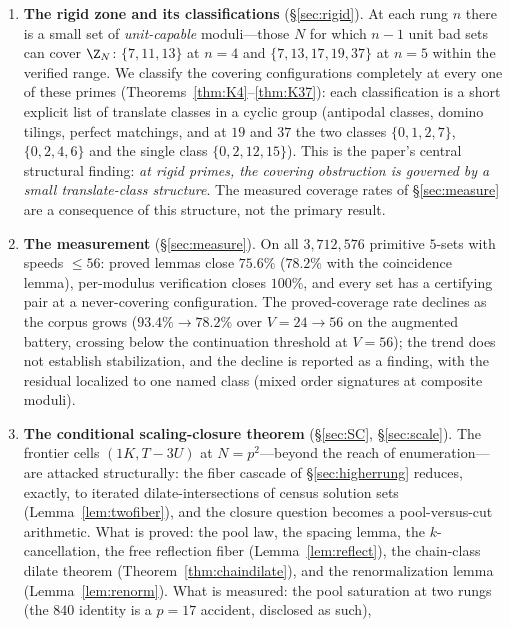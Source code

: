 \begin{enumerate}[leftmargin=1.6em,itemsep=2pt]
  (Lemma~\ref{lem:lift}), and a class-group reduction at prime moduli
  (Lemma~\ref{lem:class}).
\item \textbf{The rigid zone and its classifications}
  (\S\ref{sec:rigid}). At each rung $n$ there is a small set of
  \emph{unit-capable} moduli---those $N$ for which $n-1$ unit bad sets can
  cover $\Z_N$: $\{7,11,13\}$ at $n=4$ and $\{7,13,17,19,37\}$ at $n=5$
  within the verified range. We classify the covering configurations
  completely at every one of these primes
  (Theorems~\ref{thm:K4}--\ref{thm:K37}): each classification is a short
  explicit list of translate classes in a cyclic group (antipodal classes,
  domino tilings, perfect matchings, and at $19$ and $37$ the two classes
  $\{0,1,2,7\}$, $\{0,2,4,6\}$ and the single class $\{0,2,12,15\}$).
  This is the paper's central structural finding: \emph{at rigid primes,
  the covering obstruction is governed by a small translate-class
  structure}. The measured coverage rates of \S\ref{sec:measure} are a
  consequence of this structure, not the primary result.
\item \textbf{The measurement} (\S\ref{sec:measure}). On all
  $3{,}712{,}576$ primitive $5$-sets with speeds $\le 56$: proved lemmas
  close $75.6\%$ ($78.2\%$ with the coincidence lemma), per-modulus
  verification closes $100\%$, and every set has a certifying pair at a
  never-covering configuration. The proved-coverage rate declines as the
  corpus grows ($93.4\%\to78.2\%$ over $V=24\to56$ on the augmented
  battery, crossing below the continuation threshold at $V=56$); the trend
  does not establish stabilization, and the decline is reported as a
  finding, with the residual localized to one named class (mixed order
  signatures at composite moduli).
\item \textbf{The conditional scaling-closure theorem}
  (\S\ref{sec:SC}, \S\ref{sec:scale}). The frontier cells
  $(1K,T{-}3U)$ at $N=p^2$---beyond the reach of enumeration---are
  attacked structurally: the fiber cascade of \S\ref{sec:higherrung}
  reduces, exactly, to iterated dilate-intersections of census solution
  sets (Lemma~\ref{lem:twofiber}), and the closure question becomes a
  pool-versus-cut arithmetic. What is proved: the pool law, the spacing
  lemma, the $k$-cancellation, the free reflection fiber
  (Lemma~\ref{lem:reflect}), the chain-class dilate theorem
  (Theorem~\ref{thm:chaindilate}), and the renormalization lemma
  (Lemma~\ref{lem:renorm}). What is measured: the pool saturation at two
  rungs (the $840$ identity is a $p=17$ accident, disclosed as such),

\end{enumerate}
